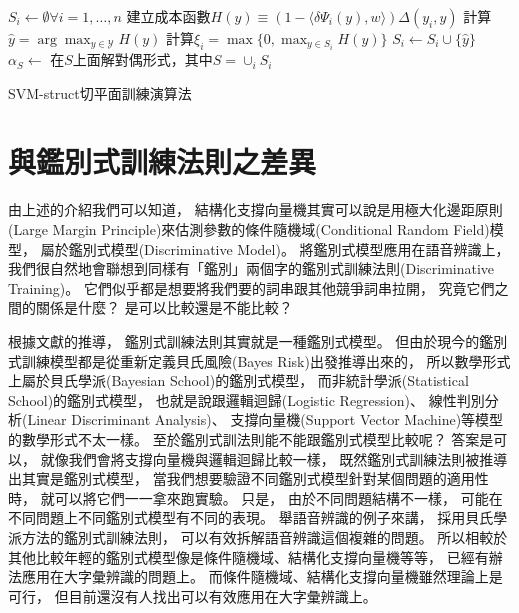   \begin{algorithm}
    \begin{algorithmic}[1]
      \STATE $S_i \leftarrow \emptyset \forall i = 1, \ldots, n$
      \REPEAT
	  \STATE 建立成本函數$H(y) \equiv (1 - \langle \delta \Psi_i (y), w \rangle) \Delta(y_i, y)$
	  \STATE 計算$\hat{y} = \arg \max_{y \in \mathcal{Y}} H(y)$
	  \STATE 計算$\xi_i = \max \lbrace 0, \max_{y \in S_i} H(y) \rbrace$
	    \STATE $S_i \leftarrow S_i \cup \lbrace \hat{y} \rbrace$
	    \STATE $\alpha_S \leftarrow$ 在$S$上面解對偶形式，其中$S = \cup_i S_i$
	  \ENDIF
	\ENDFOR
    \end{algorithmic}
    \caption{SVM-struct切平面訓練演算法}
    \label{alg:cutting_plane_svm_struct}
  \end{algorithm}

\section{與鑑別式訓練法則之差異}
  由上述的介紹我們可以知道，
  結構化支撐向量機其實可以說是用極大化邊距原則(Large Margin Principle)來估測參數的條件隨機域(Conditional Random Field)模型，
  屬於鑑別式模型(Discriminative Model)。
  將鑑別式模型應用在語音辨識上，
  我們很自然地會聯想到同樣有「鑑別」兩個字的鑑別式訓練法則(Discriminative Training)。
  它們似乎都是想要將我們要的詞串跟其他競爭詞串拉開，
  究竟它們之間的關係是什麼？
  是可以比較還是不能比較？

  根據文獻\cite{modelVStraining}的推導，
  鑑別式訓練法則其實就是一種鑑別式模型。
  但由於現今的鑑別式訓練模型都是從重新定義貝氏風險(Bayes Risk)出發推導出來的，
  所以數學形式上屬於貝氏學派(Bayesian School)的鑑別式模型，
  而非統計學派(Statistical School)的鑑別式模型，
  也就是說跟邏輯迴歸(Logistic Regression)、
  線性判別分析(Linear Discriminant Analysis)、
  支撐向量機(Support Vector Machine)等模型的數學形式不太一樣。
  至於鑑別式訓法則能不能跟鑑別式模型比較呢？
  答案是可以，
  就像我們會將支撐向量機與邏輯迴歸比較一樣，
  既然鑑別式訓練法則被推導出其實是鑑別式模型，
  當我們想要驗證不同鑑別式模型針對某個問題的適用性時，
  就可以將它們一一拿來跑實驗。
  只是，
  由於不同問題結構不一樣，
  可能在不同問題上不同鑑別式模型有不同的表現。
  舉語音辨識的例子來講，
  採用貝氏學派方法的鑑別式訓練法則，
  可以有效拆解語音辨識這個複雜的問題。
  所以相較於其他比較年輕的鑑別式模型像是條件隨機域、結構化支撐向量機等等，
  已經有辦法應用在大字彙辨識的問題上。
  而條件隨機域、結構化支撐向量機雖然理論上是可行，
  但目前還沒有人找出可以有效應用在大字彙辨識上。

